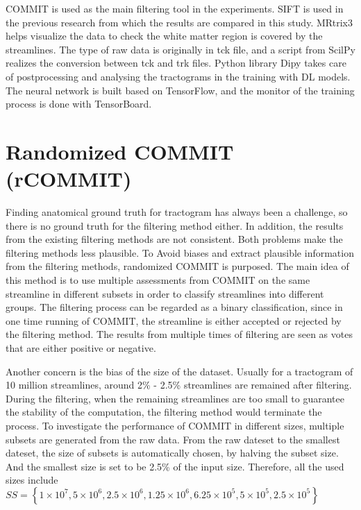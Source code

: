 COMMIT \cite{daducciCOMMITConvexOptimization2015} is used as the main filtering tool in the experiments. 
SIFT \cite{smithSIFTSphericaldeconvolutionInformed2013} is used in the previous research from which the results are compared in this study.
MRtrix3 \cite{tournierMRtrix3FastFlexible2019} helps visualize the data to check the white matter region is covered by the streamlines. 
The type of raw data is originally in tck file, and a script from ScilPy realizes the conversion between tck and trk files.
Python library Dipy takes care of postprocessing and analysing the tractograms in the training with DL models.
The neural network is built based on TensorFlow, and the monitor of the training process is done with TensorBoard.

\section{Randomized COMMIT (rCOMMIT)}
Finding anatomical ground truth for tractogram has always been a challenge, so there is no ground truth for the filtering method either.
In addition, the results from the existing filtering methods are not consistent. Both problems make the filtering methods less plausible.
To Avoid biases and extract plausible information from the filtering methods, randomized COMMIT is purposed. 
The main idea of this method is to use multiple assessments from COMMIT on the same streamline in different subsets in order to classify streamlines into different groups.
The filtering process can be regarded as a binary classification, since in one time running of COMMIT, the streamline is either accepted or rejected by the filtering method.
The results from multiple times of filtering are seen as votes that are either positive or negative.

Another concern is the bias of the size of the dataset. Usually for a tractogram of 10 million streamlines, around 2\% - 2.5\% streamlines are remained after filtering.
During the filtering, when the remaining streamlines are too small to guarantee the stability of the computation, the filtering method would terminate the process.
To investigate the performance of COMMIT in different sizes, 
multiple subsets are generated from the raw data. From the raw dateset to the smallest dateset, the size of subsets is automatically chosen, by halving
the subset size. And the smallest size is set to be 2.5\% of the input size. Therefore, all the used sizes include $SS= \left \{  1\times 10^7, 5\times 10^6, 2.5\times 10^6, 1.25\times 10^6, 6.25\times 10^5, 5\times 10^5, 2.5\times 10^5 \right \}$ 

